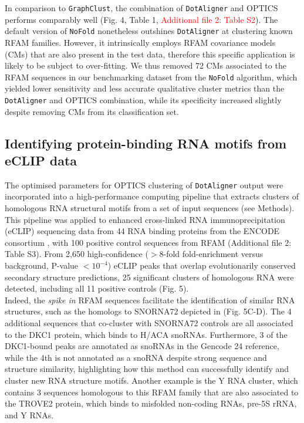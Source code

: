 \documentclass{bmcart}
\newcommand\dotaligner{\texttt{DotAligner}}
\begin{document}
In comparison to \texttt{GraphClust}, the combination of \dotaligner{} and OPTICS performs comparably well (Fig. 4, Table 1, \textcolor{red}{Additional file 2: Table S2}). 
The default version of \texttt{NoFold} nonetheless outshines \dotaligner{} at clustering known RFAM families. 
However, it intrinsically employs RFAM covariance models (CMs) that are also present in the test data, 
therefore this specific application is likely to be subject to over-fitting. 
We thus removed 72 CMs associated to the RFAM sequences in our benchmarking 
dataset from the \texttt{NoFold} algorithm, which yielded lower sensitivity and 
less accurate qualitative cluster metrics than the \dotaligner{} and OPTICS combination, while 
its specificity increased slightly despite removing CMs from its classification set. 


\subsection*{Identifying protein-binding RNA motifs from eCLIP data}
The optimised parameters for OPTICS clustering of \dotaligner{} output were incorporated into 
a high-performance computing pipeline that extracts clusters of homologous RNA structural
 motifs from a set of input sequences (see Methods).  This pipeline was applied to enhanced cross-linked 
RNA immunoprecipitation (eCLIP) sequencing data from 44 RNA binding proteins from the ENCODE consortium  \cite{van2016robust}, with 100 positive control sequences from RFAM (Additional file 2: Table S3).
From 2,650 high-confidence ($>$8-fold  fold-enrichment versus background, P-value $<10^{-4}$) eCLIP peaks 
that overlap evolutionarily conserved secondary structure predictions, 
25 significant clusters of homologous RNA were detected, including all 11 positive controls (Fig. 5).\\

Indeed, the \textit{spike in} RFAM sequences facilitate the identification of similar RNA structures, 
such as the homologs to SNORNA72 depicted in (Fig. 5C-D). The 4 additional sequences that 
co-cluster with SNORNA72 controls are all associated to the DKC1 protein, which binds to H/ACA snoRNAs. 
Furthermore, 3 of the DKC1-bound peaks are annotated as snoRNAs in the Gencode 24 reference, 
while the 4th is not annotated as a snoRNA despite strong sequence and structure similarity, 
highlighting how this method can successfully identify and cluster new RNA structure motifs. 
Another example is the Y RNA cluster, which contains 3 sequences homologous to this RFAM family 
that are also associated to the TROVE2 protein, which binds to misfolded non-coding RNAs, 
pre-5S rRNA, and Y RNAs.\\
\end{document}
